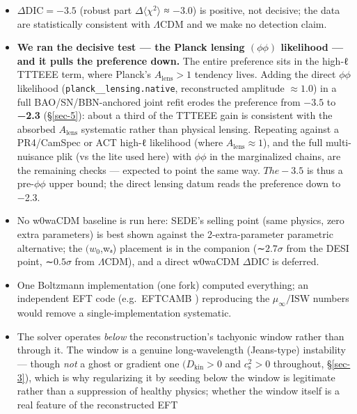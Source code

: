 \documentclass[preprint,12pt]{elsarticle}
\providecommand{\tightlist}{\setlength{\itemsep}{0pt}\setlength{\parskip}{0pt}}
\begin{document}
\begin{itemize}
\tightlist
\item
  \(\Delta \mathrm{DIC} = -3.5\) (robust part
  \(\Delta\)\(\langle\chi^2\rangle\) ≈ −3.0) is positive, not decisive;
  the data are statistically consistent with \(\Lambda \mathrm{CDM}\)
  and we make no detection claim.
\item
  \textbf{We ran the decisive test --- the Planck lensing
  \((\phi \phi )\) likelihood --- and it pulls the preference down.} The
  entire preference sits in the high-ℓ TTTEEE term, where Planck's
  \(A_{\mathrm{lens}} > 1\) tendency lives. Adding the direct
  \(\phi \phi\) likelihood (\texttt{planck\_\_\allowbreak lensing.\allowbreak native},
  reconstructed amplitude \(\approx  1.0\)) in a full
  BAO/SN/BBN-anchored joint refit erodes the preference from \(-3.5\) to
  \textbf{−2.3} (§\ref{sec-5}): about a third of the TTTEEE gain is
  consistent with the absorbed \(A_{\mathrm{lens}}\) systematic rather
  than physical lensing. Repeating against a PR4/CamSpec or ACT high-ℓ
  likelihood (where \(A_{\mathrm{lens}} \approx  1\)), and the full
  multi-nuisance plik (vs the lite used here) with \(\phi \phi\) in the
  marginalized chains, are the remaining checks --- expected to point
  the same way. \(The -3.5\) is thus a pre-\(\phi \phi\) upper bound;
  the direct lensing datum reads the preference down to −2.3.
\item
  No w0waCDM baseline is run here: SEDE's selling point (same physics,
  zero extra parameters) is best shown against the 2-extra-parameter
  parametric alternative; the \((w_{0}\),wₐ) placement is in the
  companion (∼\(2.7\sigma\) from the DESI point, ∼\(0.5\sigma\) from
  \(\Lambda \mathrm{CDM}\)), and a direct w0waCDM
  \(\Delta \mathrm{DIC}\) is deferred.
\item
  One Boltzmann implementation (one fork) computed everything; an
  independent EFT code (e.g.~EFTCAMB \citep{Hu:2013twa}) reproducing the
  \(\mu _\infty /\mathrm{ISW}\) numbers would remove a
  single-implementation systematic.
\item
  The solver operates \emph{below} the reconstruction's tachyonic window
  rather than through it. The window is a genuine long-wavelength
  (Jeans-type) instability --- though \emph{not} a ghost or gradient one
  \((D_{\mathrm{kin}} > 0\) and \(c_{\mathrm{s}}^{2} > 0\) throughout,
  §\ref{sec-3}), which is why regularizing it by seeding below the
  window is legitimate rather than a suppression of healthy physics;
  whether the window itself is a real feature of the reconstructed EFT

\end{itemize}
\end{document}
